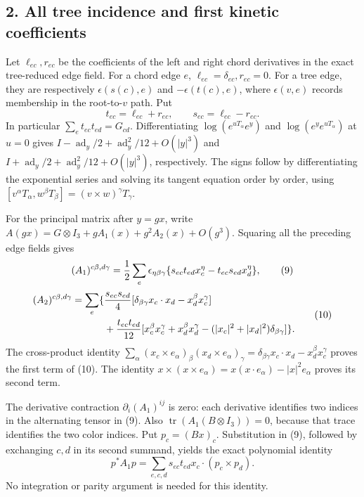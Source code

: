 \documentclass[
  11pt,
]{article}
\begin{document}
\subsection{2. All tree incidence and first kinetic
coefficients}\label{weak-coupling-part-15-all-tree-incidence-and-first-kinetic-coefficients}

Let \(\ell_{ec},r_{ec}\) be the coefficients of the left and right chord
derivatives in the exact tree-reduced edge field. For a chord edge
\(e\), \(\ell_{ec}=\delta_{ec},r_{ec}=0\). For a tree edge, they are
respectively \(\epsilon(s(c),e)\) and \(-\epsilon(t(c),e)\), where
\(\epsilon(v,e)\) records membership in the root-to-\(v\) path. Put \[
 t_{ec}=\ell_{ec}+r_{ec},\qquad s_{ec}=\ell_{ec}-r_{ec}.
 \tag{8}
\] In particular \(\sum_e t_{ec}t_{ed}=G_{cd}\). Differentiating
\(\log(e^{uT_\alpha}e^y)\) and \(\log(e^ye^{uT_\alpha})\) at \(u=0\)
gives \(I-\operatorname{ad}_y/2+\operatorname{ad}_y^2/12+O(|y|^3)\) and
\(I+\operatorname{ad}_y/2+\operatorname{ad}_y^2/12+O(|y|^3)\),
respectively. The signs follow by differentiating the exponential series
and solving its tangent equation order by order, using
\([v^\alpha T_\alpha,w^\beta T_\beta]=(v\times w)^\gamma T_\gamma\).

For the principal matrix after \(y=gx\), write
\(A(gx)=G\otimes I_3+gA_1(x)+g^2A_2(x)+O(g^3)\). Squaring all the
preceding edge fields gives \[
 (A_1)^{c\beta,d\gamma}
 ={1\over2}\sum_e\epsilon_{\eta\beta\gamma}
   \{s_{ec}t_{ed}x_c^\eta-t_{ec}s_{ed}x_d^\eta\},
 \tag{9}
\] \[
 \begin{split}
 (A_2)^{c\beta,d\gamma}=\sum_e\{&
 {s_{ec}s_{ed}\over4}
 [\delta_{\beta\gamma}x_c\cdot x_d-x_d^\beta x_c^\gamma]\\
 &+{t_{ec}t_{ed}\over12}
 [x_c^\beta x_c^\gamma+x_d^\beta x_d^\gamma
                 -( |x_c|^2+|x_d|^2)\delta_{\beta\gamma}]\}.
 \end{split}
 \tag{10}
\] The cross-product identity \(\sum_\alpha(x_c\times e_\alpha)_\beta
(x_d\times e_\alpha)_\gamma
=\delta_{\beta\gamma}x_c\cdot x_d-x_d^\beta x_c^\gamma\) proves the
first term of (10). The identity
\(x\times(x\times e_\alpha)=x(x\cdot e_\alpha)-|x|^2e_\alpha\) proves
its second term.

The derivative contraction \(\partial_i(A_1)^{ij}\) is zero: each
derivative identifies two indices in the alternating tensor in (9). Also
\(\operatorname{tr}(A_1(B\otimes I_3))=0\), because that trace
identifies the two color indices. Put \(p_c=(Bx)_c\). Substitution in
(9), followed by exchanging \(c,d\) in its second summand, yields the
exact polynomial identity \[
 p^*A_1p=\sum_{e,c,d}s_{ec}t_{ed}
                  x_c\cdot(p_c\times p_d).
 \tag{11}
\] No integration or parity argument is needed for this identity.
\end{document}
